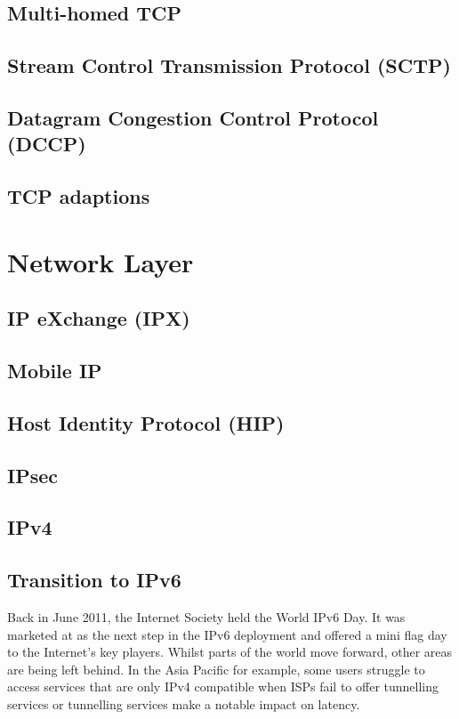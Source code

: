 \documentclass[journal]{IEEEtran}
\begin{document}
\subsection{ Multi-homed TCP }
\subsection{Stream Control Transmission Protocol (SCTP)}
\subsection{Datagram Congestion Control Protocol (DCCP)}
\subsection{TCP adaptions}


\section{Network Layer}
\subsection{IP eXchange (IPX)}
\subsection{Mobile IP}
\subsection{Host Identity Protocol (HIP)}
\subsection{IPsec}
\subsection{IPv4}
\subsection{Transition to IPv6}
Back in June 2011, the Internet Society held the World IPv6 Day. It was marketed at as the next step in the IPv6 deployment and offered a mini flag day to the Internet’s key players. Whilst parts of the world move forward, other areas are being left behind. In the Asia Pacific for example, some users struggle to access services that are only IPv4 compatible when ISPs fail to offer tunnelling services or tunnelling services make a notable impact on latency.
\end{document}
